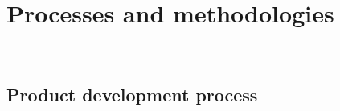 
\chapter{Processes and methodologies}
\label{cap:processi-metodologie}

\\

\section{Product development process}
